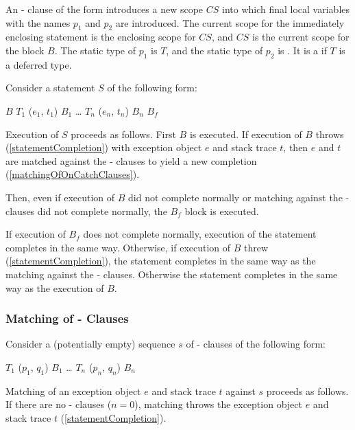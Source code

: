 \documentclass[makeidx]{article}
\begin{document}
\LMHash{}%
An \ON-\CATCH{} clause of the form
introduces a new scope $CS$ into which final local variables
with the names $p_1$ and $p_2$ are introduced.
The current scope for the immediately enclosing \TRY{} statement
is the enclosing scope for $CS$,
and $CS$ is the current scope for the block $B$.
The static type of $p_1$ is $T$,
and the static type of $p_2$ is .
It is a  if $T$ is a deferred type.

\LMHash{}%
Consider a \TRY{} statement $S$ of the following form:

\begin{normativeDartCode}
\TRY{} $B$
\ON{} $T_1$ \CATCH{} ($e_1$, $t_1$) $B_1$
\ldots{}
\ON{} $T_n$ \CATCH{} ($e_n$, $t_n$) $B_n$
\FINALLY{} $B_f$
\end{normativeDartCode}

\LMHash{}%
Execution of $S$ proceeds as follows.
First $B$ is executed.
If execution of $B$ throws (\ref{statementCompletion})
with exception object $e$ and stack trace $t$,
then $e$ and $t$ are matched against the \ON-\CATCH{} clauses
to yield a new completion
(\ref{matchingOfOnCatchClauses}).

\LMHash{}%
Then, even if execution of $B$ did not complete normally
or matching against the \ON-\CATCH{} clauses did not complete normally,
the $B_f$ block is executed.

\LMHash{}%
If execution of $B_f$ does not complete normally,
execution of the \TRY{} statement completes in the same way.
Otherwise, if execution of $B$ threw (\ref{statementCompletion}),
the \TRY{} statement completes in the same way as
the matching against the \ON-\CATCH{} clauses.
Otherwise the \TRY{} statement completes in the same way as
the execution of $B$.


\subsubsection{Matching of \ON-\CATCH{} Clauses}

\LMHash{}%
Consider a (potentially empty) sequence $s$ of
\ON-\CATCH{} clauses of the following form:

\begin{normativeDartCode}
\ON{} $T_1$ \CATCH{} ($p_1$, $q_1$) $B_1$
\ldots
\ON{} $T_n$ \CATCH{} ($p_n$, $q_n$) $B_n$
\end{normativeDartCode}

\LMHash{}%
Matching of an exception object $e$ and stack trace $t$ against $s$
proceeds as follows.
If there are no \ON-\CATCH{} clauses ($n = 0$),
matching throws the exception object $e$ and stack trace $t$
(\ref{statementCompletion}).
\end{document}
